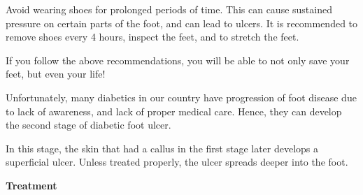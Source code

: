 \begin{figure}\end{figure}

 \item 
 Avoid wearing shoes for prolonged periods of time. This can cause sustained pressure on certain parts of the foot, and can lead to ulcers. It is recommended to remove shoes every 4 hours, inspect the feet, and to stretch the feet.

\begin{figure}\end{figure}

If you follow the above recommendations, you will be able to not only save your feet, but even your life!


Unfortunately, many diabetics in our country have progression of foot disease due to lack of awareness, and lack of proper medical care. Hence, they can develop the second stage of diabetic foot ulcer.

In this stage, the skin that had a callus in the first stage later develops a superficial ulcer. Unless treated properly, the ulcer spreads deeper into the foot.

\textbf{Treatment}


